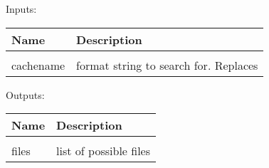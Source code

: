 Inputs:

\begin{tabular}{|l|p{5cm}|}
\hline
\textbf{Name} & \textbf{Description} \\
\hline \hline \\
cachename & format string to search for. Replaces %
\end{tabular}
Outputs:

\begin{tabular}{|l|p{5cm}|}
\hline
\textbf{Name} & \textbf{Description} \\
\hline \hline \\
files & list of possible files  \\ \hline
\end{tabular}
